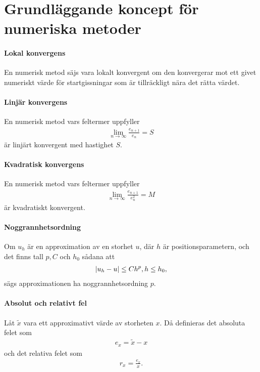 \section{Grundläggande koncept för numeriska metoder}

\paragraph{Lokal konvergens}
En numerisk metod säjs vara lokalt konvergent om den konvergerar mot ett givet numeriskt värde för startgissningar som är tillräckligt nära det rätta värdet.

\paragraph{Linjär konvergens}
En numerisk metod vars feltermer uppfyller
\begin{align*}
	\lim\limits_{n\to\infty}\frac{e_{n + 1}}{e_{n}} = S
\end{align*}
är linjärt konvergent med hastighet $S$.

\paragraph{Kvadratisk konvergens}
En numerisk metod vars feltermer uppfyller
\begin{align*}
	\lim\limits_{n\to\infty}\frac{e_{n + 1}}{e_{n}^{2}} = M
\end{align*}
är kvadratiskt konvergent.

\paragraph{Noggrannhetsordning}
Om $u_{h}$ är en approximation av en storhet $u$, där $h$ är positionsparametern, och det finns tall $p, C$ och $h_{0}$ sådana att
\begin{align*}
	\abs{u_{h} - u} \leq Ch^{p}, h\leq h_{0},
\end{align*}
sägs approximationen ha noggrannhetsordning $p$.

\paragraph{Absolut och relativt fel}
Låt $\tilde{x}$ vara ett approximativt värde av storheten $x$. Då definieras det absoluta felet som
\begin{align*}
	e_{x} = \tilde{x} - x
\end{align*}
och det relativa felet som
\begin{align*}
	r_{x} = \frac{e_{x}}{x}.
\end{align*}

